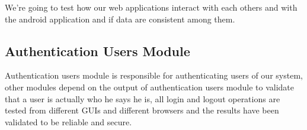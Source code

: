 We're going to test how our web applications interact with each others and with the android application and if data are consistent among them.

\subsection{Authentication Users Module}
	Authentication users module is responsible for authenticating users of our system, other modules depend on the output of authentication users module to validate that a user is actually who he says he is, all login and logout operations are tested from different GUIs and different browsers and the results have been validated to be reliable and secure.